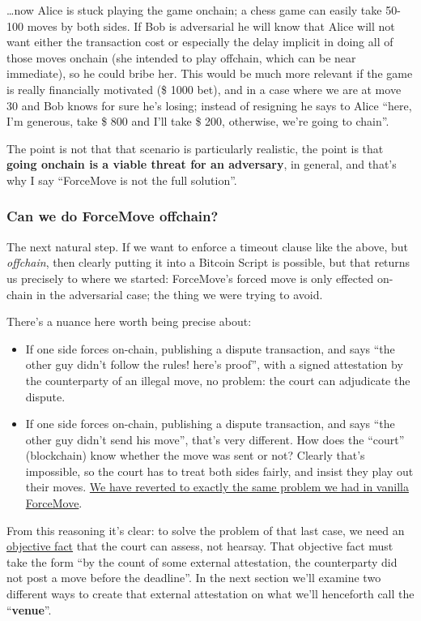 \documentclass[11pt]{article}
\begin{document}
\ldots now Alice is stuck playing the game onchain; a chess game can easily take 50-100 moves by both sides. If Bob is adversarial he will know that Alice will not want either the transaction cost or especially the delay implicit in doing all of those moves onchain (she intended to play offchain, which can be near immediate), so he could bribe her. This would be much more relevant if the game is really financially motivated (\$ 1000 bet), and in a case where we are at move 30 and Bob knows for sure he's losing; instead of resigning he says to Alice ``here, I'm generous, take \$ 800 and I'll take \$ 200, otherwise, we're going to chain''.

The point is not that that scenario is particularly realistic, the point is that \textbf{going onchain is a viable threat for an adversary}, in general, and that's why I say ``ForceMove is not the full solution''.

\subsubsection{Can we do ForceMove offchain?}

The next natural step. If we want to enforce a timeout clause like the above, but \emph{offchain}, then clearly putting it into a Bitcoin Script is possible, but that returns us precisely to where we started: ForceMove's forced move is only effected on-chain in the adversarial case; the thing we were trying to avoid.

There's a nuance here worth being precise about:

\begin{itemize}

\item If one side forces on-chain, publishing a dispute transaction, and says ``the other guy didn't follow the rules! here's proof'', with a signed attestation by the counterparty of an illegal move, no problem: the court can adjudicate the dispute.
\item If one side forces on-chain, publishing a dispute transaction, and says ``the other guy didn't send his move'', that's very different. How does the ``court'' (blockchain) know whether the move was sent or not? Clearly that's impossible, so the court has to treat both sides fairly, and insist they play out their moves. \uline{We have reverted to exactly the same problem we had in vanilla ForceMove}.
\end{itemize}

From this reasoning it's clear: to solve the problem of that last case, we need an \uline{objective fact} that the court can assess, not hearsay. That objective fact must take the form ``by the count of some external attestation, the counterparty did not post a move before the deadline''. In the next section we'll examine two different ways to create that external attestation on what we'll henceforth call the ``\textbf{venue}''.
\end{document}
